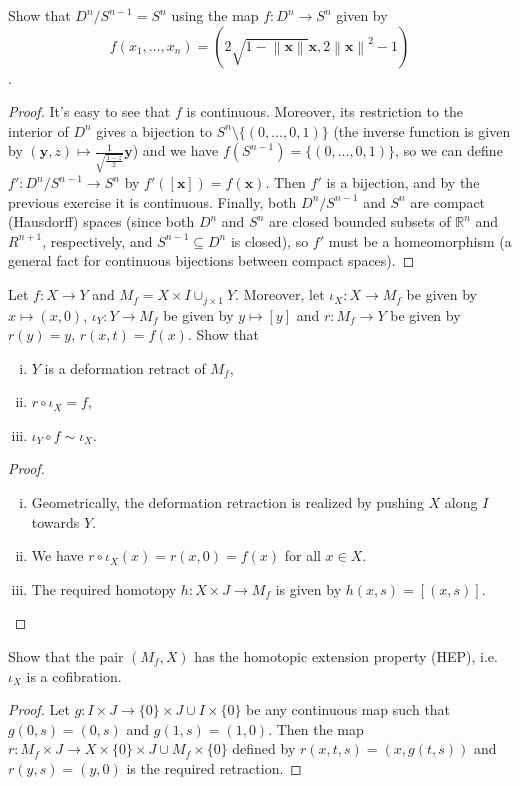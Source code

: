 \documentclass[12pt,a4paper]{article}
\newcommand{\norm}[1]{\left\lVert#1\right\rVert}
\newcommand{\R}{\mathbb{R}}
\begin{document}
\ex Show that $D^n/S^{n-1}=S^n$ using the map $f:D^n\to S^n$ given by $$f(x_1,\dots,x_n)=(2\sqrt{1-\norm{\textbf{x}}}\textbf{x},2\norm{\textbf{x}}^2-1)$$.
\begin{proof}
It's easy to see that $f$ is continuous. Moreover, its restriction to the interior of $D^n$ gives a bijection to $S^n\setminus\{(0,\dots,0,1)\}$ (the inverse function is given by $(\textbf{y},z)\mapsto \frac{1}{\sqrt{\frac{1-z}{2}}}\textbf{y}$) and we have $f(S^{n-1})=\{(0,\dots,0,1)\}$, so we can define $f':D^n/S^{n-1}\to S^n$ by $f'([\textbf{x}])=f(\textbf{x})$. Then $f'$ is a bijection, and by the previous exercise it is continuous. Finally, both $D^n/S^{n-1}$ and $S^n$ are compact (Hausdorff) spaces (since both $D^n$ and $S^n$ are closed bounded subsets of $\R^n$ and $R^{n+1}$, respectively, and $S^{n-1}\subseteq D^n$ is closed), so $f'$ must be a homeomorphism (a general fact for continuous bijections between compact spaces).
\end{proof}

\ex Let $f:X\to Y$ and $M_f=X\times I\cup_{j\times 1}Y$. Moreover, let $\iota_X:X\to M_f$ be given by $x\mapsto (x,0)$, $\iota_Y:Y\to M_f$ be given by $y\mapsto [y]$ and $r:M_f\to Y$ be given by $r(y)=y$, $r(x,t)=f(x)$. Show that
\begin{enumerate}[i)]
\item $Y$ is a deformation retract of $M_f$,
\item $r\circ \iota_X=f$,
\item $\iota_Y\circ f\sim \iota_X$.
\end{enumerate}
\begin{proof}\mbox{}\newline
\begin{enumerate}[i)]
\item Geometrically, the deformation retraction is realized by pushing $X$ along $I$ towards $Y$.
\item We have $r\circ \iota_X(x)=r(x,0)=f(x)$ for all $x\in X$.
\item The required homotopy $h:X\times J \to M_f$ is given by $h(x,s)=[(x,s)]$.
\end{enumerate}
\end{proof}

\ex Show that the pair $(M_f,X)$ has the homotopic extension property (HEP), i.e. $\iota_X$ is a cofibration.
\begin{proof}
Let $g:I\times J\to\{0\}\times J\cup I\times\{0\}$ be any continuous map such that $g(0,s)=(0,s)$ and $g(1,s)=(1,0)$. Then the map $r:M_f\times J\to X\times\{0\}\times J\cup M_f\times\{0\}$ defined by 
$r(x,t,s)=(x,g(t,s))$ and $r(y,s)=(y,0)$ is the required retraction.
\end{proof}
\end{document}
